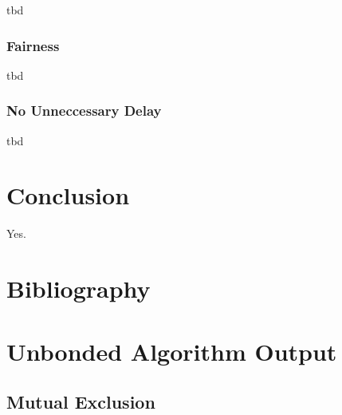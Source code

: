 \documentclass{llncs}
\begin{document}
tbd

\subsubsection{Fairness}

tbd

\subsubsection{No Unneccessary Delay}

tbd

\section{Conclusion}

Yes.

\section{Bibliography}




\appendix

\section{Unbonded Algorithm Output}

\subsection{Mutual Exclusion \label{mc:app:unb:mutex}}
\end{document}
